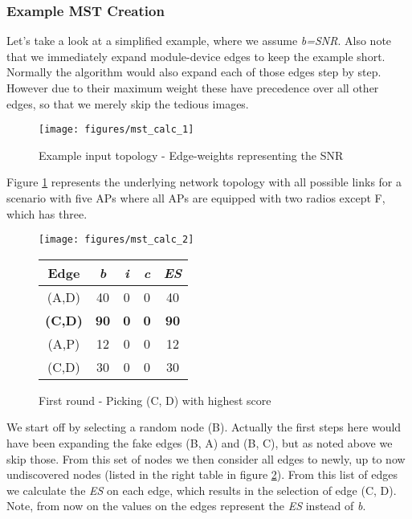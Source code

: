      \subsubsection{Example MST Creation}
	Let's take a look at a simplified example, where we assume \textit{b=SNR}. Also note that we immediately expand module-device edges to keep the example short.
	Normally the algorithm would also expand each of those edges step by step. However due to their maximum weight these have precedence over all other edges, 
	so that we merely skip the tedious images.
	\begin{figure}[h!]
	  \centering
	  \begin{minipage}{0.5\textwidth}
	    \texttt{[image: figures/mst\_calc\_1]}
	  \end{minipage}
	  \caption{Example input topology - Edge-weights representing the \ac{SNR}}
	  \label{fig:mst_calc_initial}
	\end{figure}
	
	Figure \ref{fig:mst_calc_initial} represents the underlying network topology with all possible links for a scenario with five APs where all APs are equipped with two
	radios except F, which has three.
	
	\begin{figure}[h!]
	  \centering
	  \begin{minipage}{7.4cm}
	    \texttt{[image: figures/mst\_calc\_2]}
	  \end{minipage}
	  \begin{minipage}{4cm}
	    \begin{tabular}{c||c|c|c||c}
	      Edge & \textit{b} & \textit{i} & \textit{c} & \textit{ES}\\ \hline\hline
	      (A,D) & 40 & 0 & 0 & 40 \\ \hline
	      \textbf{(C,D)} & \textbf{90} & \textbf{0} & \textbf{0} & \textbf{90} \\ \hline
	      (A,P) & 12 & 0 & 0 & 12 \\ \hline
	      (C,D) & 30 & 0 & 0 & 30 \\ \hline
	    \end{tabular}
	  \end{minipage}
	  \caption{First round - Picking (C, D) with highest score}
	  \label{fig:mst_calc_2}
	\end{figure}
	
\newpage
	
	We start off by selecting a random node (B). Actually the first steps here would have been expanding the fake edges (B, A) and (B, C), 
	but as noted above we skip those. From this set of nodes we then consider all edges to newly, 
	up to now undiscovered nodes (listed in the right table in figure \ref{fig:mst_calc_2}).
	From this list of edges we calculate the \textit{ES} on each edge, which results in the selection of edge (C, D). 
	Note, from now on the values on the edges represent the \textit{ES} instead of \textit{b}.
	

